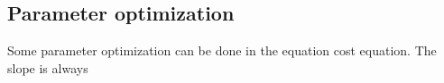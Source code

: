 \subsection{Parameter optimization}

Some parameter optimization can be done in the equation cost equation. The slope is always

%
%
%
%
%
%
